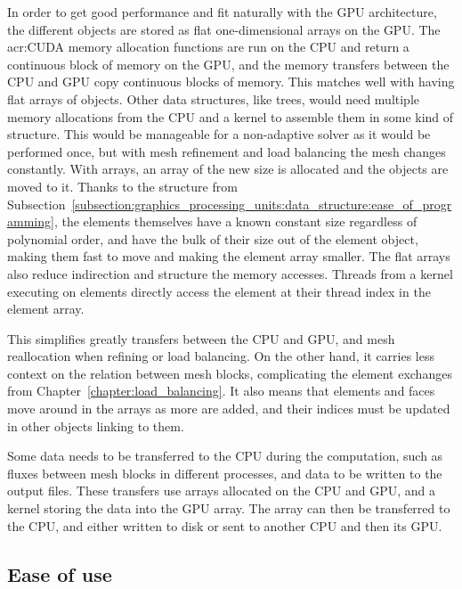 In order to get good performance and fit naturally with the GPU architecture, the different objects
are stored as flat one-dimensional arrays on the GPU. The \acrshort{acr:CUDA} memory allocation
functions are run on the CPU and return a continuous block of memory on the GPU, and the memory
transfers between the CPU and GPU copy continuous blocks of memory. This matches well with having
flat arrays of objects. Other data structures, like trees, would need multiple memory allocations
from the CPU and a kernel to assemble them in some kind of structure. This would be manageable for a
non-adaptive solver as it would be performed once, but with mesh refinement and load balancing the
mesh changes constantly. With arrays, an array of the new size is allocated and the objects are
moved to it. Thanks to the structure from
Subsection~\ref{subsection:graphics_processing_units:data_structure:ease_of_programming}, the
elements themselves have a known constant size regardless of polynomial order, and have the bulk of
their size out of the element object, making them fast to move and making the element array smaller.
The flat arrays also reduce indirection and structure the memory accesses. Threads from a kernel
executing on elements directly access the element at their thread index in the element array.

This simplifies greatly transfers between the CPU and GPU, and mesh reallocation when refining or
load balancing. On the other hand, it carries less context on the relation between mesh blocks,
complicating the element exchanges from Chapter~\ref{chapter:load_balancing}. It also means that
elements and faces move around in the arrays as more are added, and their indices must be updated in
other objects linking to them. 

Some data needs to be transferred to the CPU during the computation, such as fluxes between mesh
blocks in different processes, and data to be written to the output files. These transfers use
arrays allocated on the CPU and GPU, and a kernel storing the data into the GPU array. The array can
then be transferred to the CPU, and either written to disk or sent to another CPU and then its GPU.

\subsection{Ease of use} \label{subsection:graphics_processing_units:data_structure:ease_of_use}

